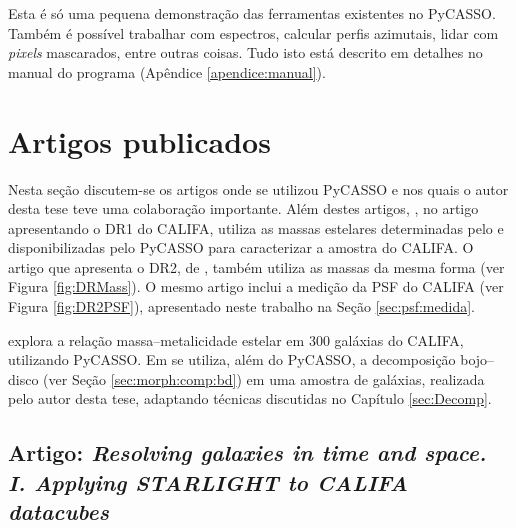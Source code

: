 Esta é só uma pequena demonstração das ferramentas existentes no PyCASSO. Também
é possível trabalhar com espectros, calcular perfis azimutais, lidar com {\em
pixels} mascarados, entre outras coisas. Tudo isto está descrito em detalhes no
manual do programa (Apêndice \ref{apendice:manual}).



\section{Artigos publicados}
\label{sec:pycasso:art}

Nesta seção discutem-se os artigos onde se utilizou PyCASSO e nos quais o autor
desta tese teve uma colaboração importante. Além destes artigos,
\citet{Husemann2013}, no artigo apresentando o DR1 do CALIFA, utiliza as massas
estelares determinadas pelo \starlight e disponibilizadas pelo PyCASSO para
caracterizar a amostra do CALIFA. O artigo que apresenta o DR2, de
\citet{GarciaBenito2015}, também utiliza as massas da mesma forma (ver Figura
\ref{fig:DRMass}). O mesmo artigo inclui a medição da PSF do CALIFA (ver Figura
\ref{fig:DR2PSF}), apresentado neste trabalho na Seção \ref{sec:psf:medida}.

\citet{GonzalezDelgado2014b} explora a relação massa--metalicidade estelar em
300 galáxias do CALIFA, utilizando PyCASSO. Em \citet{GonzalezDelgado2015} se
utiliza, além do PyCASSO, a decomposição bojo--disco (ver Seção
\ref{sec:morph:comp:bd}) em uma amostra de galáxias, realizada pelo autor desta
tese, adaptando técnicas discutidas no Capítulo \ref{sec:Decomp}.



\subsection{Artigo: {\em Resolving galaxies in time and space. I. Applying
STARLIGHT to CALIFA datacubes}}
\label{sec:pycasso:art:Resolving1}

